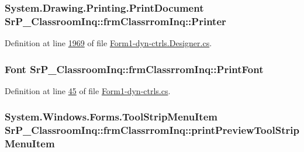 \hypertarget{class_sr_p___classroom_inq_1_1frm_classrrom_inq_a27d138482c23d40f494f49984816227e}{
\subsubsection[{\-Printer}]{\setlength{\rightskip}{0pt plus 5cm}\-System.\-Drawing.\-Printing.\-Print\-Document {\bf \-Sr\-P\-\_\-\-Classroom\-Inq\-::frm\-Classrrom\-Inq\-::\-Printer}}}
\label{class_sr_p___classroom_inq_1_1frm_classrrom_inq_a27d138482c23d40f494f49984816227e}


\-Definition at line \hyperlink{_form1-dyn-ctrls_8_designer_8cs_source_l01969}{1969} of file \hyperlink{_form1-dyn-ctrls_8_designer_8cs_source}{\-Form1-\/dyn-\/ctrls.\-Designer.\-cs}.

\hypertarget{class_sr_p___classroom_inq_1_1frm_classrrom_inq_a314e4a61ea8458c5198273335dcf0b5f}{
\subsubsection[{\-Print\-Font}]{\setlength{\rightskip}{0pt plus 5cm}\-Font {\bf \-Sr\-P\-\_\-\-Classroom\-Inq\-::frm\-Classrrom\-Inq\-::\-Print\-Font}}}
\label{class_sr_p___classroom_inq_1_1frm_classrrom_inq_a314e4a61ea8458c5198273335dcf0b5f}


\-Definition at line \hyperlink{_form1-dyn-ctrls_8cs_source_l00045}{45} of file \hyperlink{_form1-dyn-ctrls_8cs_source}{\-Form1-\/dyn-\/ctrls.\-cs}.

\hypertarget{class_sr_p___classroom_inq_1_1frm_classrrom_inq_a56c14d36b467c4787937369037c22717}{
\subsubsection[{print\-Preview\-Tool\-Strip\-Menu\-Item}]{\setlength{\rightskip}{0pt plus 5cm}\-System.\-Windows.\-Forms.\-Tool\-Strip\-Menu\-Item {\bf \-Sr\-P\-\_\-\-Classroom\-Inq\-::frm\-Classrrom\-Inq\-::print\-Preview\-Tool\-Strip\-Menu\-Item}}}
\label{class_sr_p___classroom_inq_1_1frm_classrrom_inq_a56c14d36b467c4787937369037c22717}


